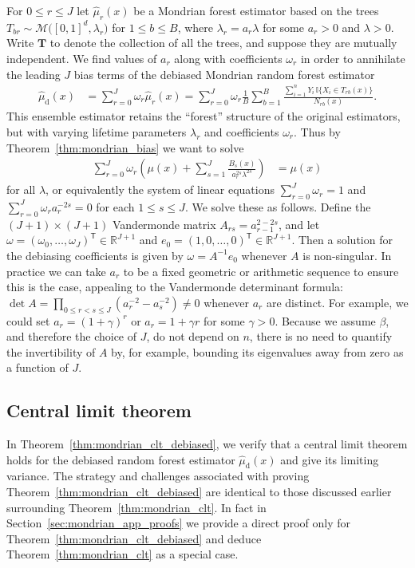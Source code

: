 \documentclass[11pt,lof]{puthesis}
\newcommand{\R}{\ensuremath{\mathbb{R}}}
\newcommand{\I}{\ensuremath{\mathbb{I}}}
\newcommand{\rd}{\ensuremath{\mathrm{d}}}
\newcommand{\bT}{\ensuremath{\mathbf{T}}}
\newcommand{\cM}{\ensuremath{\mathcal{M}}}
\newcommand{\T}{\ensuremath{\mathsf{T}}}
\theoremstyle{break}
\theoremstyle{proof}
\begin{document}
For $0 \leq r \leq J$ let $\hat \mu_r(x)$ be a Mondrian forest estimator
based on the trees $T_{b r} \sim \cM\big([0,1]^d, \lambda_r \big)$
for $1 \leq b \leq B$, where $\lambda_r = a_r \lambda$ for some $a_r > 0$
and $\lambda > 0$. Write $\bT$ to denote the collection of all the trees,
and suppose they are mutually independent. We find values of $a_r$ along with
coefficients $\omega_r$ in order to annihilate the leading $J$ bias terms of
the debiased Mondrian random forest estimator
%
\begin{align}
\label{eq:mondrian_debiased}
\hat \mu_\rd(x)
&= \sum_{r=0}^J \omega_r \hat \mu_r(x)
= \sum_{r=0}^{J} \omega_r
\frac{1}{B} \sum_{b=1}^B
\frac{\sum_{i=1}^n Y_i \, \I\big\{ X_i \in T_{r b}(x) \big\}} {N_{r b}(x)}.
\end{align}
%
This ensemble estimator retains the ``forest'' structure of the original
estimators, but with varying lifetime parameters $\lambda_r$ and coefficients
$\omega_r$. Thus by Theorem~\ref{thm:mondrian_bias} we want to solve
%
\begin{align*}
\sum_{r=0}^{J} \omega_r
\left( \mu(x) + \sum_{s=1}^{J} \frac{B_{s}(x)}{a_r^{2s} \lambda^{2s}} \right)
&= \mu(x)
\end{align*}
%
for all $\lambda$, or equivalently the system of linear equations
$\sum_{r=0}^{J} \omega_r = 1$
and $\sum_{r=0}^{J} \omega_r a_r^{-2s} = 0$ for each $1 \leq s \leq J$.
We solve these as follows. Define the $(J+1) \times (J+1)$ Vandermonde matrix
$A_{r s} = a_{r-1}^{2-2s}$,
and let $\omega = (\omega_0, \ldots, \omega_J)^\T \in \R^{J+1}$
and $e_0 = (1, 0, \ldots, 0)^\T \in \R^{J+1}$.
Then a solution for the debiasing coefficients is given by
$\omega = A^{-1} e_0$ whenever $A$ is non-singular.
In practice we can take $a_r$ to be a fixed geometric or arithmetic sequence
to ensure this is the case, appealing to the Vandermonde determinant formula:
$\det A = \prod_{0 \leq r < s \leq J} (a_r^{-2} - a_s^{-2})
\neq 0$ whenever $a_r$ are distinct. For example, we could set
$a_r = (1 + \gamma)^r$ or $a_r = 1 + \gamma r$ for some $\gamma > 0$.
Because we assume $\beta$, and therefore the choice of $J$, do not
depend on $n$, there is no need to quantify
the invertibility of $A$ by, for example, bounding its eigenvalues
away from zero as a function of $J$.

\subsection{Central limit theorem}

In Theorem~\ref{thm:mondrian_clt_debiased}, we verify that a central
limit theorem holds for the debiased
random forest estimator $\hat\mu_\rd(x)$ and give its limiting variance.
The strategy and challenges associated with proving
Theorem~\ref{thm:mondrian_clt_debiased} are identical to those discussed earlier
surrounding Theorem~\ref{thm:mondrian_clt}. In fact in
Section~\ref{sec:mondrian_app_proofs}
we provide a direct proof only for Theorem~\ref{thm:mondrian_clt_debiased}
and deduce Theorem~\ref{thm:mondrian_clt} as a special case.
\end{document}
